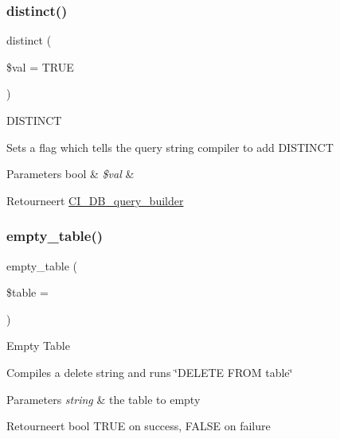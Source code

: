 \subsubsection{\texorpdfstring{distinct()}{distinct()}}
{\footnotesize\ttfamily distinct (\begin{DoxyParamCaption}\item[{}]{\$val = {\ttfamily TRUE} }\end{DoxyParamCaption})}

D\+I\+S\+T\+I\+N\+CT

Sets a flag which tells the query string compiler to add D\+I\+S\+T\+I\+N\+CT


\begin{DoxyParams}[1]{Parameters}
bool & {\em \$val} & \\
\hline
\end{DoxyParams}
\begin{DoxyReturn}{Retourneert}
\mbox{\hyperlink{class_c_i___d_b__query__builder}{C\+I\+\_\+\+D\+B\+\_\+query\+\_\+builder}} 
\end{DoxyReturn}
\mbox{\label{class_c_i___d_b__query__builder_af665fbf0b83f396d6c5529aca1f43517}} 
\subsubsection{\texorpdfstring{empty\_table()}{empty\_table()}}
{\footnotesize\ttfamily empty\+\_\+table (\begin{DoxyParamCaption}\item[{}]{\$table = {\ttfamily \textquotesingle{}\textquotesingle{}} }\end{DoxyParamCaption})}

Empty Table

Compiles a delete string and runs \char`\"{}\+D\+E\+L\+E\+T\+E F\+R\+O\+M table\char`\"{}


\begin{DoxyParams}{Parameters}
{\em string} & the table to empty \\
\hline
\end{DoxyParams}
\begin{DoxyReturn}{Retourneert}
bool T\+R\+UE on success, F\+A\+L\+SE on failure 
\end{DoxyReturn}
\mbox{\label{class_c_i___d_b__query__builder_aa3c94d79d552f6e10277b01c447ebbb6}} 
